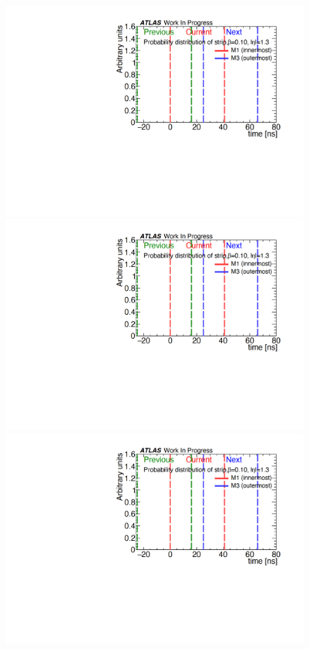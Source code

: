 \begin{figure}[tbp]
    \begin{minipage}{0.33\hsize}
    \centering   
    \includegraphics[width=\textwidth,page=11]{img/rec/rec_e1.3_s.pdf}
    \subcaption{}
    \end{minipage}
    \begin{minipage}{0.33\hsize}
    \centering   
    \includegraphics[width=\textwidth,page=9]{img/rec/rec_e1.3_s.pdf}
    \subcaption{}
    \end{minipage}
    \begin{minipage}{0.33\hsize}
    \centering   
    \includegraphics[width=\textwidth,page=7]{img/rec/rec_e1.3_s.pdf}

\end{minipage}
\end{figure}
